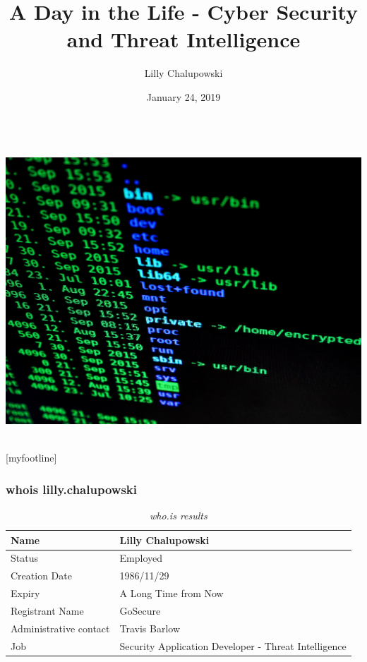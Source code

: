 \documentclass[aspectratio=169]{beamer}
\title{A Day in the Life - Cyber Security and Threat Intelligence}
\institute{GoSecure}
\author{Lilly Chalupowski}
\date{January 24, 2019}
\begin{document}
\begin{frame}[t]
  \begin{center}
    \begingroup
    \fontsize{20pt}{20pt}\selectfont
    \inserttitle \\
    \endgroup
    \bigskip
    \includegraphics[scale=0.05]{title} \\
    \bigskip
    \insertauthor \\
    \insertdate
  \end{center}
\end{frame}

[myfootline]

\begin{frame}
  \frametitle{whois lilly.chalupowski}
  \begin{table}
    \caption{\textit{who.is results}}
    \begin{tabularx}{\textwidth}{|X|X|}
      \hline
      Name & Lilly Chalupowski \\
      \hline
      Status & Employed \\
      \hline
      Creation Date & 1986/11/29 \\
      \hline
      Expiry & A Long Time from Now \\
      \hline
      Registrant Name & GoSecure \\
      \hline
      Administrative contact & Travis Barlow \\
      \hline
      Job & Security Application Developer - Threat Intelligence \\
      \hline
    \end{tabularx}
  \end{table}
\end{frame}
\end{document}
